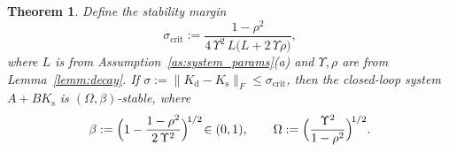 \documentclass[letterpaper, 10pt, conference]{ieeeconf}
\newtheorem{theorem}{Theorem}
\begin{document}

\begin{theorem}
\label{thm:lyap-stab} Define the stability margin
\begin{equation}\label{eq:sigma-crit}
  \sigma_{\mathrm{crit}}
  := \frac{1 - \rho^{2}}{4\,\Upsilon^{2}\,L
       \bigl(L + 2\,\Upsilon\rho\bigr)},
\end{equation}
where $L$ is from Assumption~\ref{as:system_params}(a) and
$\Upsilon,\rho$ are from Lemma~\ref{lemm:decay}.
If $\sigma := \|K_{\mathrm{d}} - K_{\mathrm{s}}\|_F \le \sigma_{\mathrm{crit}}$, then the closed-loop system 
$A+BK_{\mathrm{s}}$ is $(\Omega,\beta)$-stable, where
\begin{equation}\label{eq:omega-beta}
  \beta :=
    \Bigl(1 - \frac{1-\rho^{2}}{2\,\Upsilon^{2}}\Bigr)^{\!1/2}
    \!\in (0,1),
  \qquad
  \Omega :=
    \Bigl(\frac{\Upsilon^{2}}{1-\rho^{2}}\Bigr)^{\!1/2}.
\end{equation}
\end{theorem}
\end{document}
